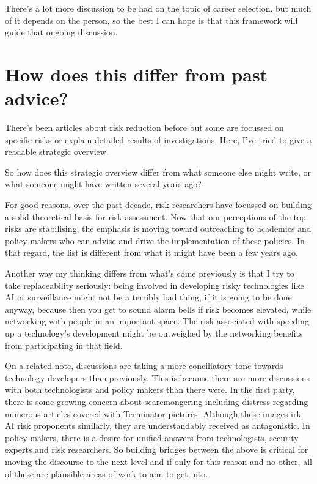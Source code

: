 \documentclass[12pt]{article}
\begin{document}
There's a lot more discussion to be had on the topic of career selection, but much of it depends on the person, 
so the best I can hope is that this framework will guide that ongoing discussion.

\section{How does this differ from past advice?}
There's been articles about risk reduction before but some are focussed on specific risks or explain detailed 
results of investigations. Here, I've tried to give a readable strategic overview.

So how does this strategic overview differ from what someone else might write, or what someone might have written 
several years ago?

For good reasons, over the past decade, risk researchers have focussed on building a solid 
theoretical basis for risk assessment. Now that our perceptions of the top risks are stabilising, 
the emphasis is moving toward outreaching to academics and policy makers who can advise and drive 
the implementation of these policies. In that regard, the list is different from what it might have been a few years ago.

Another way my thinking differs from what's come previously is that I try to take replaceability 
seriously: being involved in developing risky technologies like AI or surveillance might not be 
a terribly bad thing, if it is going to be done anyway, because then you get to sound alarm bells 
if risk becomes elevated, while networking with people in an important space. The risk associated 
with speeding up a technology's development might be outweighed by the networking benefits from 
participating in that field.

On a related note, discussions are taking a more conciliatory tone towards technology developers than 
previously. This is because 
there are more discussions with both technologists and policy makers than there were. 
In the first party, there is some growing concern about scaremongering including distress regarding 
numerous articles covered with Terminator pictures. Although these images irk AI risk proponents similarly, they are 
understandably received as antagonistic. In policy makers, there is a desire for unified answers from 
technologists, security experts and risk researchers. So building bridges between the above is critical 
for moving the discourse to the next level and if only for this reason and no other, all of these are plausible 
areas of work to aim to get into.
\end{document}
